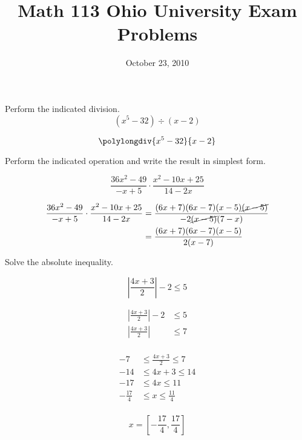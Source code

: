 \documentclass[fleqn,addpoints]{exam}
\title{Math 113 Ohio University Exam Problems}
\author{}
\date{October 23, 2010}
\begin{document}
\maketitle

\begin{questions}

\question
Perform the indicated division.
\[
  (x^5 - 32) \div (x-2)
\]

\begin{solution}[1cm]

\[ \polylongdiv{x^5 - 32}{x-2} \]

\end{solution}


\question
Perform the indicated operation and write the result in simplest form.

\[
  \frac{36x^2-49}{-x+5} \cdot \frac{x^2-10x+25}{14-2x}
\]

\begin{solution}[1cm]
\begin{align*}
    \frac{36x^2-49}{-x+5} \cdot \frac{x^2-10x+25}{14-2x} &= \frac{(6x+7)(6x-7)(x-5)\cancel{(x-5)}}{-2\cancel{(x-5)}(7-x)} \\
        &= \frac{(6x+7)(6x-7)(x-5)}{2(x-7)} \\
\end{align*}

\end{solution}

\question
Solve the absolute inequality.

\[
  \left| \frac{4x+3}{2} \right| - 2 \leq 5
\]

\begin{solution}[1cm]

\begin{align*}
  \left| \frac{4x+3}{2} \right| - 2 &\leq 5 \\
  \left| \frac{4x+3}{2} \right|  &\leq 7 \\
\end{align*}

\begin{align*}
  -7 &\leq \frac{4x+3}{2} \leq 7 \\
  -14 &\leq 4x+3 \leq 14 \\
  -17 &\leq 4x \leq 11 \\
  -\frac{17}{4} &\leq x \leq \frac{11}{4} \\
\end{align*}

\[
  x = \left[-\frac{17}{4}, \frac{17}{4} \right]
\]
\end{solution}


\end{questions}
\end{document}
